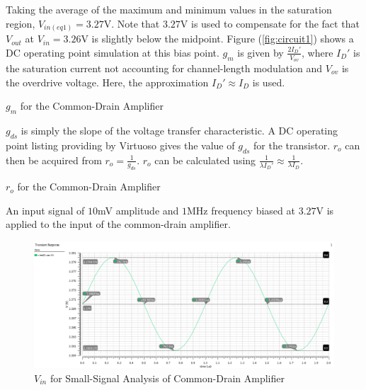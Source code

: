 Taking the average of the maximum and minimum values in the saturation region, $V_{in(eq1)} = 3.27$\si{\volt}.
Note that $3.27$\si{\volt} is used to compensate for the fact that $V_{out}$ at $V_{in} = 3.26$\si{\volt} is slightly below the midpoint.
Figure (\ref{fig:circuit1}) shows a DC operating point simulation at this bias point.
$g_{m}$ is given by $\frac{2I_{D}'}{V_{ov}}$, where $I_{D}'$ is the saturation current not accounting for channel-length modulation and $V_{ov}$ is the overdrive voltage.
Here, the approximation $I_{D}' \approx I_{D}$ is used.

\FloatBarrier

\begin{table}[h!]
	\centering
	\caption{$g_{m}$ for the Common-Drain Amplifier}
	\label{tab:common_drain_amp_gm}
\end{table}

\FloatBarrier

$g_{ds}$ is simply the slope of the voltage transfer characteristic.
A DC operating point listing providing by Virtuoso gives the value of $g_{ds}$ for the transistor.
$r_{o}$ can then be acquired from $r_{o} = \frac{1}{g_{ds}}$.
$r_{o}$ can be calculated using $\frac{1}{\lambda I_{D}'} \approx \frac{1}{\lambda I_{D}}$.

\FloatBarrier

\begin{table}[h!]
	\centering
	\caption{$r_{o}$ for the Common-Drain Amplifier}
	\label{tab:common_drain_amp_ro}
\end{table}

\FloatBarrier

An input signal of $10$\si{\milli\volt} amplitude and $1$\si{\mega\hertz} frequency biased at $3.27$\si{\volt} is applied to the input of the common-drain amplifier.

\FloatBarrier

\begin{figure}[h!]
	\centering
	\includegraphics[scale=0.45]{../images/sim1_vin.PNG}
	\caption{$V_{in}$ for Small-Signal Analysis of Common-Drain Amplifier}
	\label{fig:sim1_vin}
\end{figure}

